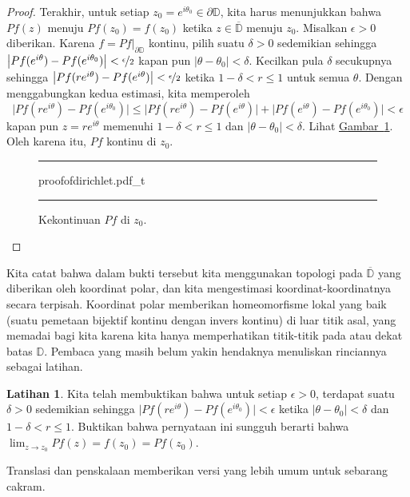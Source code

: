 \documentclass[12pt,openany]{book}
\newcommand{\sabs}[1]{\lvert {#1} \rvert}
\newcommand{\babs}[1]{\bigl\lvert {#1} \bigr\rvert}
\newcommand{\D}{{\mathbb{D}}}
\theoremstyle{plain}
\theoremstyle{remark}
\theoremstyle{definition}
\newenvironment{exbox}{%
    \def\FrameCommand{\vrule width 1pt \relax\hspace{10pt}}%
    \MakeFramed{\advance\hsize-\width\FrameRestore}%
}{%
    \endMakeFramed
}
\newenvironment{myfig}{%
\begin{figure}[h!t]
\noindent\rule{\textwidth}{0.5pt}\vspace{12pt}\par\centering}%
{\par\noindent\rule{\textwidth}{0.5pt}
\end{figure}}
\theoremstyle{exercise}
\newtheorem{exercise}{Latihan}[section]
\theoremstyle{example}
\newcommand{\figureref}[1]{\hyperref[#1]{Gambar~\ref*{#1}}}
\begin{document}
\begin{proof}
Terakhir, untuk setiap $z_0 = e^{i\theta_0} \in \partial \D$,
kita harus menunjukkan bahwa
$Pf(z)$ menuju $Pf(z_0)=f(z_0)$ ketika $z \in \overline{\D}$ menuju $z_0$.
Misalkan $\epsilon > 0$ diberikan. Karena $f = Pf|_{\partial \D}$
kontinu, pilih suatu $\delta > 0$ sedemikian sehingga
$\babs{Pf(e^{i\theta})-Pf(e^{i\theta_0})} < \nicefrac{\epsilon}{2}$
kapan pun $\sabs{\theta-\theta_0} < \delta$.
Kecilkan pula $\delta$ secukupnya sehingga
$\babs{Pf(re^{i \theta})-Pf(e^{i\theta})} < \nicefrac{\epsilon}{2}$
ketika $1 - \delta < r \leq 1$ untuk semua $\theta$.
Dengan menggabungkan kedua estimasi, kita memperoleh
\begin{equation*}
\babs{Pf(re^{i\theta})-Pf(e^{i\theta_0})}
\leq
\babs{Pf(re^{i\theta})-Pf(e^{i\theta})}
+
\babs{Pf(e^{i\theta})-Pf(e^{i\theta_0})}
< \epsilon
\end{equation*}
kapan pun $z=re^{i\theta}$ memenuhi $1 - \delta < r \leq 1$ dan
$\sabs{\theta-\theta_0} < \delta$.
Lihat \figureref{fig:proofofdirichlet}.
Oleh karena itu, $Pf$
kontinu di $z_0$.
\begin{myfig}
{proofofdirichlet.pdf_t}
\caption{Kekontinuan $Pf$ di $z_0$.\label{fig:proofofdirichlet}}
\end{myfig}
\end{proof}

Kita catat bahwa dalam bukti tersebut kita menggunakan topologi pada $\overline{\D}$
yang diberikan oleh koordinat polar, dan kita mengestimasi koordinat-koordinatnya secara terpisah.
Koordinat polar memberikan homeomorfisme lokal yang baik
(suatu pemetaan bijektif kontinu dengan invers kontinu) di luar
titik asal, yang memadai bagi kita karena kita hanya memperhatikan titik-titik
pada atau dekat batas $\D$. Pembaca yang masih belum yakin
hendaknya menuliskan rinciannya sebagai latihan.

\begin{exbox}
\begin{exercise}
Kita telah membuktikan bahwa untuk setiap $\epsilon > 0$, terdapat suatu $\delta > 0$ sedemikian sehingga
$\babs{Pf(re^{i\theta})-Pf(e^{i\theta_0})} < \epsilon$
ketika $\sabs{\theta-\theta_0} < \delta$ dan
$1 - \delta < r \leq 1$. Buktikan bahwa pernyataan ini sungguh berarti bahwa
$\lim_{z \to z_0} Pf(z) = f(z_0) = Pf(z_0)$.
\end{exercise}
\end{exbox}

Translasi dan penskalaan memberikan versi yang lebih umum untuk
sebarang cakram.
\end{document}
